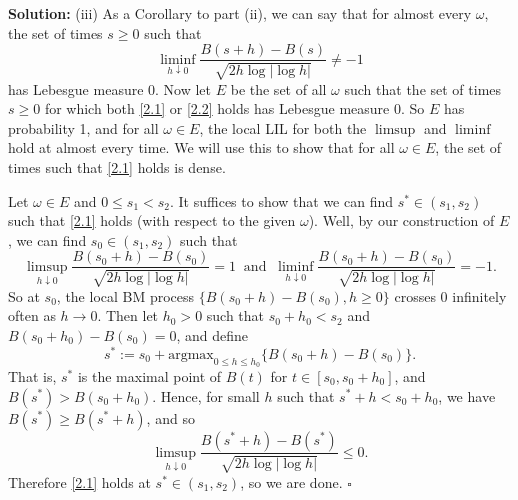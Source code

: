 \documentclass[12pt]{article}
\newcounter{ProofCounter}
\newenvironment{Solution}{\stepcounter{ProofCounter}\textbf{Solution:}}{\hfill$\square$}
\begin{document}
\begin{Solution}
  (iii) As a Corollary to part (ii), we can say that for almost every $\omega$, the set of times $s \geq 0$ such that
  \begin{equation}
    \liminf_{h\downarrow 0} \frac{B(s + h) - B(s)}{\sqrt{2h\log|\log h|}} \neq -1
    \label{2.2}
  \end{equation}
  has Lebesgue measure 0. Now let $E$ be the set of all $\omega$ such that the set of times $s \geq 0$ for which both \eqref{2.1} or \eqref{2.2} holds has Lebesgue measure 0. So $E$ has probability 1, and for all $\omega \in E$, the local LIL for both the $\limsup$ and $\liminf$ hold at almost every time. We will use this to show that for all $\omega \in E$, the set of times such that \eqref{2.1} holds is dense.

  Let $\omega \in E$ and $0 \leq s_1 < s_2$. It suffices to show that we can find $s^* \in (s_1, s_2)$ such that \eqref{2.1} holds (with respect to the given $\omega$). Well, by our construction of $E$, we can find $s_0 \in (s_1, s_2)$ such that
  \[
    \limsup_{h\downarrow 0} \frac{B(s_0 + h) - B(s_0)}{\sqrt{2h\log|\log h|}} = 1 \ \text{ and } \ \liminf_{h\downarrow 0} \frac{B(s_0 + h) - B(s_0)}{\sqrt{2h\log|\log h|}} = -1.
  \]
  So at $s_0$, the local BM process $\{ B(s_0 + h) - B(s_0), h \geq 0 \}$ crosses 0 infinitely often as $h \rightarrow 0$. Then let $h_0 > 0$ such that $s_0 + h_0 < s_2$ and $B(s_0 + h_0) - B(s_0) = 0$, and define
  \[
    s^* := s_0 + \text{argmax}_{0\leq h \leq h_0} \{ B(s_0 + h) - B(s_0) \}.
  \]
  That is, $s^*$ is the maximal point of $B(t)$ for $t \in [s_0, s_0 + h_0]$, and $B(s^*) > B(s_0 + h_0)$. Hence, for small $h$ such that $s^* + h < s_0 + h_0$, we have
  $B(s^*) \geq B(s^* + h)$, and so
  \[
    \limsup_{h\downarrow 0} \frac{B(s^* + h) - B(s^*)}{\sqrt{2h\log|\log h|}} \leq 0.
  \]
  Therefore \eqref{2.1} holds at $s^* \in (s_1, s_2)$, so we are done.
\end{Solution}
\end{document}
